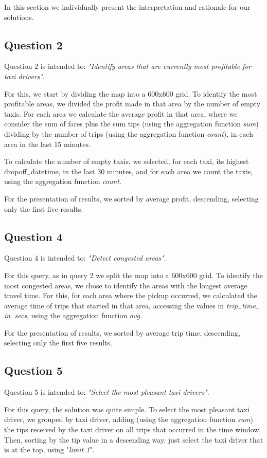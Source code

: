 In this section we individually present the interpretation and rationale for our solutions.

\subsection{Question 2}

Question 2 is intended to: \textit{"Identify areas that are currently most profitable for taxi drivers"}.\par
For this, we start by dividing the map into a 600x600 grid. To identify the most profitable areas, we divided the profit made in that area by the number of empty taxis.
For each area we calculate the average profit in that area, where we consider the sum of fares plus the sum tips (using the aggregation function \textit{sum}) dividing by the number of trips (using the aggregation function \textit{count}), in each area in the last 15 minutes.\par
To calculate the number of empty taxis, we selected, for each taxi, its highest dropoff$_-$datetime, in the last 30 minutes, and for each area we count the taxis, using the aggregation function \textit{count}.\par
For the presentation of results, we sorted by average profit, descending, selecting only the first five results. 

\subsection{Question 4}

Question 4 is intended to: \textit{"Detect congested areas"}.\par
For this query, as in query 2 we split the map into a 600x600 grid. To identify the most congested areas, we chose to identify the areas with the longest average travel time. For this, for each area where the pickup occurred, we calculated the average time of trips that started in that area, accessing the values in \textit{trip$_-$time$_-$in$_-$secs}, using the aggregation function \textit{avg}. \par
For the presentation of results, we sorted by average trip time, descending, selecting only the first five results. 

\subsection{Question 5}

Question 5 is intended to: \textit{"Select the most pleasant taxi drivers"}.\par
For this query, the solution was quite simple. To select the most pleasant taxi driver, we grouped by taxi driver, adding (using the aggregation function \textit{sum}) the tips received by the taxi driver on all trips that occurred in the time window. Then, sorting by the tip value in a descending way, just select the taxi driver that is at the top, using "\textit{limit 1}". 

